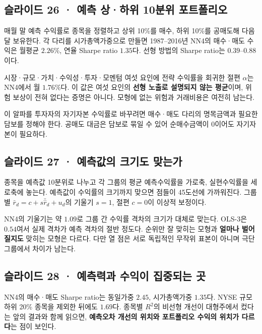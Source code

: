 \documentclass[11pt,a4paper]{article}
\begin{document}
\subsection{슬라이드 26 · 예측 상·하위 10분위 포트폴리오}
매월 말 예측 수익률로 종목을 정렬하고 상위 10\%를 매수, 하위 10\%를 공매도해 다음 달 보유한다. 각 다리를 시가총액가중으로 만들면 1987–2016년 NN4의 매수·매도 수익은 월평균 $2.26\%$, 연율 Sharpe ratio $1.35$다. 선형 방법의 Sharpe ratio는 $0.39$–$0.88$이다.\par

시장·규모·가치·수익성·투자·모멘텀 여섯 요인에 전략 수익률을 회귀한 절편 $\alpha$는 NN4에서 월 $1.76\%$다. 이 값은 여섯 요인의 \textbf{선형 노출로 설명되지 않는 평균}이며, 위험 보상이 전혀 없다는 증명은 아니다. 모형에 없는 위험과 거래비용은 여전히 남는다.\par

이 알파를 투자자의 자기자본 수익률로 바꾸려면 매수·매도 다리의 명목금액과 필요한 담보를 정해야 한다. 공매도 대금은 담보로 묶일 수 있어 순매수금액이 0이어도 자기자본이 필요하다.\par

\subsection{슬라이드 27 · 예측값의 크기도 맞는가}
종목을 예측값 10분위로 나누고 각 그룹의 평균 예측수익률을 가로축, 실현수익률을 세로축에 놓는다. 예측값이 수익률의 크기까지 맞으면 점들이 45도선에 가까워진다. 그룹별 $\bar r_d=c+s\bar{\hat r}_d+u_d$의 기울기 $s=1$, 절편 $c=0$이 이상적 보정이다.\par

NN4의 기울기는 약 $1.09$로 그룹 간 수익률 격차의 크기가 대체로 맞는다. OLS-3은 $0.54$여서 실제 격차가 예측 격차의 절반 정도다. 순위만 잘 맞히는 모형과 \textbf{얼마나 벌어질지도} 맞히는 모형은 다르다. 다만 열 점은 서로 독립적인 무작위 표본이 아니며 극단 그룹에서 차이가 남는다.\par

\subsection{슬라이드 28 · 예측력과 수익이 집중되는 곳}
NN4의 매수·매도 Sharpe ratio는 동일가중 $2.45$, 시가총액가중 $1.35$다. NYSE 규모 하위 20\% 종목을 제외한 뒤에도 $1.69$다. 종목별 $R^2$의 비선형 개선이 대형주에서 컸다는 앞의 결과와 함께 읽으면, \textbf{예측오차 개선의 위치와 포트폴리오 수익의 위치가 다르다}는 점이 보인다.\par
\end{document}
